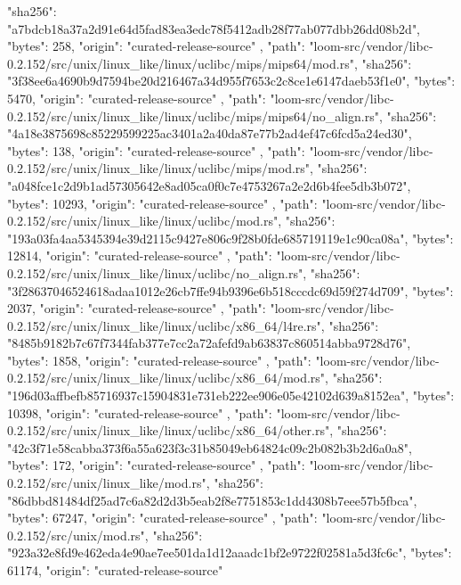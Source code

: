 {{      "sha256": "a7bdcb18a37a2d91e64d5fad83ea3edc78f5412adb28f77ab077dbb26dd08b2d",
      "bytes": 258,
      "origin": "curated-release-source"
    },
    {
      "path": "loom-src/vendor/libc-0.2.152/src/unix/linux_like/linux/uclibc/mips/mips64/mod.rs",
      "sha256": "3f38ee6a4690b9d7594be20d216467a34d955f7653c2c8ce1e6147daeb53f1e0",
      "bytes": 5470,
      "origin": "curated-release-source"
    },
    {
      "path": "loom-src/vendor/libc-0.2.152/src/unix/linux_like/linux/uclibc/mips/mips64/no_align.rs",
      "sha256": "4a18e3875698c85229599225ac3401a2a40da87e77b2ad4ef47c6fcd5a24ed30",
      "bytes": 138,
      "origin": "curated-release-source"
    },
    {
      "path": "loom-src/vendor/libc-0.2.152/src/unix/linux_like/linux/uclibc/mips/mod.rs",
      "sha256": "a048fce1c2d9b1ad57305642e8ad05ca0f0c7e4753267a2e2d6b4fee5db3b072",
      "bytes": 10293,
      "origin": "curated-release-source"
    },
    {
      "path": "loom-src/vendor/libc-0.2.152/src/unix/linux_like/linux/uclibc/mod.rs",
      "sha256": "193a03fa4aa5345394e39d2115c9427e806c9f28b0fde685719119e1c90ca08a",
      "bytes": 12814,
      "origin": "curated-release-source"
    },
    {
      "path": "loom-src/vendor/libc-0.2.152/src/unix/linux_like/linux/uclibc/no_align.rs",
      "sha256": "3f28637046524618adaa1012e26cb7ffe94b9396e6b518cccdc69d59f274d709",
      "bytes": 2037,
      "origin": "curated-release-source"
    },
    {
      "path": "loom-src/vendor/libc-0.2.152/src/unix/linux_like/linux/uclibc/x86_64/l4re.rs",
      "sha256": "8485b9182b7c67f7344fab377e7cc2a72afefd9ab63837c860514abba9728d76",
      "bytes": 1858,
      "origin": "curated-release-source"
    },
    {
      "path": "loom-src/vendor/libc-0.2.152/src/unix/linux_like/linux/uclibc/x86_64/mod.rs",
      "sha256": "196d03affbefb85716937c15904831e731eb222ee906e05e42102d639a8152ea",
      "bytes": 10398,
      "origin": "curated-release-source"
    },
    {
      "path": "loom-src/vendor/libc-0.2.152/src/unix/linux_like/linux/uclibc/x86_64/other.rs",
      "sha256": "42c3f71e58cabba373f6a55a623f3c31b85049eb64824c09c2b082b3b2d6a0a8",
      "bytes": 172,
      "origin": "curated-release-source"
    },
    {
      "path": "loom-src/vendor/libc-0.2.152/src/unix/linux_like/mod.rs",
      "sha256": "86dbbd81484df25ad7c6a82d2d3b5eab2f8e7751853c1dd4308b7eee57b5fbca",
      "bytes": 67247,
      "origin": "curated-release-source"
    },
    {
      "path": "loom-src/vendor/libc-0.2.152/src/unix/mod.rs",
      "sha256": "923a32e8fd9e462eda4e90ae7ee501da1d12aaadc1bf2e9722f02581a5d3fc6c",
      "bytes": 61174,
      "origin": "curated-release-source"
}}
